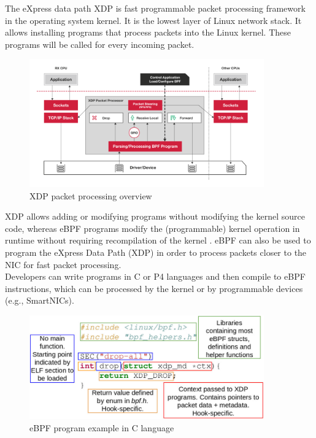 The eXpress data path XDP is fast programmable packet processing framework in the operating system kernel.
It is the lowest layer of Linux network stack. It allows installing programs that process packets into the Linux kernel.
These programs will be called for every incoming packet.\\

\begin{figure}[H]
    \centering
    \includegraphics[width=0.9\textwidth]{resources/images/xdp-packet-processing-1024x560.png}
    \caption{XDP packet processing overview}
    \label{fig:xdp-packet-processing}
\end{figure}


XDP allows adding or modifying programs without modifying the kernel source code, whereas eBPF programs modify the (programmable)
kernel operation in runtime without requiring recompilation of the kernel \cite{vieira2020fast}.
eBPF can also be used to program the eXpress Data Path (XDP) in order to process packets closer to the NIC for fast packet processing.\\
Developers can write programs in C or P4 languages and then compile to eBPF instructions,
which can be processed by the kernel or by programmable devices (e.g., SmartNICs).\\

\begin{figure}[H]
    \centering
    \includegraphics[width=0.9\textwidth]{resources/images/Dropworld-example-illustrating-the-structure-of-an-eBPF-program.png}
    \caption{eBPF program example in C language \cite{vieira2020fast}}
    \label{fig:ebpf-program}
\end{figure}

